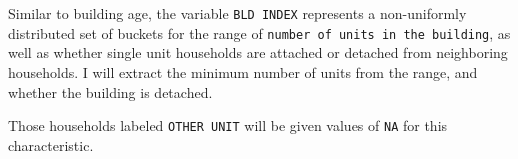 \documentclass[]{article}
\newenvironment{Shaded}{\begin{snugshade}}{\end{snugshade}}
\newcommand{\DataTypeTok}[1]{\textcolor[rgb]{0.13,0.29,0.53}{#1}}
\newcommand{\KeywordTok}[1]{\textcolor[rgb]{0.13,0.29,0.53}{\textbf{#1}}}
\newcommand{\NormalTok}[1]{#1}
\newcommand{\OperatorTok}[1]{\textcolor[rgb]{0.81,0.36,0.00}{\textbf{#1}}}
\newcommand{\OtherTok}[1]{\textcolor[rgb]{0.56,0.35,0.01}{#1}}
\newcommand{\StringTok}[1]{\textcolor[rgb]{0.31,0.60,0.02}{#1}}
\begin{document}
\begin{Shaded}
\end{Shaded}

Similar to building age, the variable \texttt{BLD\ INDEX} represents a
non-uniformly distributed set of buckets for the range of
\texttt{number\ of\ units\ in\ the\ building}, as well as whether single
unit households are attached or detached from neighboring households. I
will extract the minimum number of units from the range, and whether the
building is detached.

Those households labeled \texttt{OTHER\ UNIT} will be given values of
\texttt{NA} for this characteristic.
\end{document}
